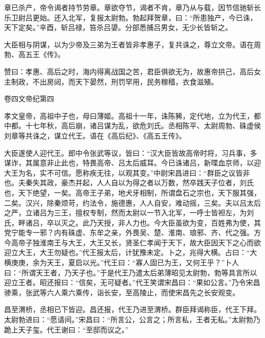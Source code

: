 \documentclass[12pt,UTF8]{ctexbook}
\begin{document}
章已杀产，帝令谒者持节劳章。章欲夺节，谒者不肯，章乃从与载，因节信驰斩长乐卫尉吕更始。还入北军，复报太尉勃。勃起拜贺章，曰：“所患独产，今已诛，天下定矣。”辛酉，斩吕禄，笞杀吕嬃。分部悉捕吕男女，无少长皆斩之。



大臣相与阴谋，以为少帝及三弟为王者皆非孝惠子，复共诛之，尊立文帝。语在周勃、高五王《传》。



赞曰：孝惠、高后之时，海内得离战国之苦，君臣俱欲无为，故惠帝拱己，高后女主制政，不出房闼，而天下晏然，刑罚罕用，民务稼穑，衣食滋殖。





卷四文帝纪第四



孝文皇帝，高祖中子也，母曰薄姬。高祖十一年，诛陈豨，定代地，立为代王，都中都。十七年秋，高后崩，诸吕谋为乱，欲危刘氏。丞相陈平、太尉周勃、硃虚侯刘章等共诛之，谋立代王。语在《高后纪》、《高五王传》。



大臣遂使人迎代王。郎中令张武等议，皆曰：“汉大臣皆故高帝时将，习兵事，多谋诈，其属意非止此也，特畏高帝、吕太后威耳。今已诛诸吕，新喋血京师，以迎大王为名，实不可信。愿称疾无往，以观其变。”中尉宋昌进曰：“群臣之议皆非也。夫秦失其政，豪杰并起，人人自以为得之者以万数，然卒践天子位者，刘氏也，天下绝望，一矣。高帝王子弟，地犬牙相制，所谓盘石之宗也，天下服其强，二矣。汉兴，除秦烦苛，约法令，施德惠，人人自安，难动摇，三矣。夫以吕太后之严，立诸吕为三王，擅权专制，然而太尉以一节入北军，一呼士皆袒左，为刘氏，畔诸吕，卒以灭之。此乃天授，非人力也。今大臣虽欲为变，百姓弗为使，其党宁能专一邪？内有硃虚、东牟之亲，外畏吴、楚、淮南、琅邪、齐、代之强。方今高帝子独淮南王与大王，大王又长，贤圣仁孝闻于天下，故大臣因天下之心而欲迎立大王，大王勿疑也。”代王报太后，计犹豫未定。卜之，兆得大横。占曰：“大横庚庚，余为天王，夏启以光。”代王曰：“寡人固已为王，又何王乎？”卜人曰：“所谓天王者，乃天子也。”于是代王乃遣太后弟薄昭见太尉勃，勃等具言所以迎立王者。昭还报曰：“信矣，无可疑者。”代王笑谓宋昌曰：“果如公言。”乃令宋昌骖乘，张武等六人乘六乘传，诣长安，至高陵止，而使宋昌先之长安观变。



昌至渭桥，丞相已下皆迎。昌还报，代王乃进至渭桥。群臣拜谒称臣，代王下拜。太尉勃进曰：“愿请间。”宋昌曰：“所言公，公言之；所言私，王者无私。”太尉勃乃跪上天子玺。代王谢曰：“至邸而议之。”
\end{document}

